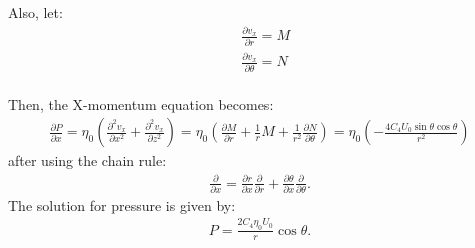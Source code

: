 \documentclass[a4paper,11pt]{article}
\begin{document}
Also, let:
\begin{align}
&\frac{\partial v_x}{\partial r} = M\\
&\frac{\partial v_x}{\partial \theta} = N\\
\end{align}

Then, the X-momentum equation becomes:
\begin{align}
\frac{\displaystyle \partial P}{\displaystyle \partial x}=\eta_0\left(\frac{\displaystyle \partial^2 v_x}{\displaystyle \partial x^2} + \frac{\displaystyle \partial^2 v_x}{\displaystyle \partial z^2}\right) = \eta_0\left(\frac{\partial M}{\partial r} + \frac{1}{r}M +\frac{1}{r^2}\frac{\partial N}{\partial \theta}\right) = \eta_0\left( -\frac{4C_4U_0\sin\theta\cos\theta}{r^2}\right)
\end{align}
after using the chain rule:
\begin{align}
 \frac{\partial}{\partial x}=\frac{\partial r}{\partial x}\frac{\partial}{\partial r}+\frac{\partial \theta}{\partial x}\frac{\partial}{\partial \theta}.
 \end{align}
The solution for pressure is given by:
\begin{align}
P =  \frac{2C_4\eta_0 U_0}{r}\cos\theta.
 \end{align}


%


\end{document}
